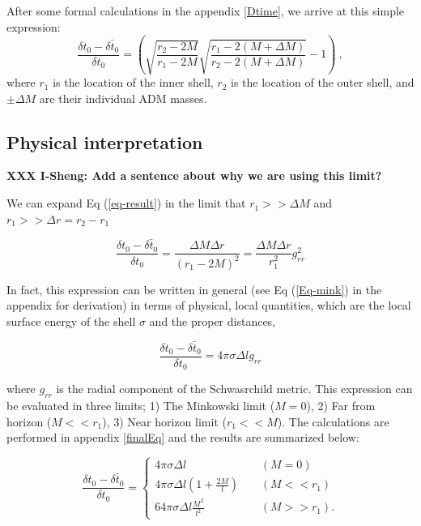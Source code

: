 \documentclass[aps,showpacs,onecolumn,floats,prd,superscriptaddress,nofootinbib]{revtex4-1}
\begin{document}
After some formal calculations in the appendix \ref{Dtime}, we arrive at this simple expression:
\begin{equation}
\frac{\delta t_0 - \bar{\delta t_0}}{\delta t_0} = 
\left(\sqrt{\frac{r_2-2M}{r_1-2M}}\sqrt{\frac{r_1-2(M+\Delta M)}{r_2-2(M+\Delta M)}}-1\right)~,
\label{eq-result}
\end{equation}
where $r_1$ is the location of the inner shell, $r_2$ is the location of the outer shell, and $\pm\Delta M$ are their individual ADM masses. 

\subsection{Physical interpretation}

\textbf{XXX I-Sheng: Add a sentence about why we are using this limit?}
 
We can expand Eq (\ref{eq-result}) in the limit that $r_1>> \Delta M$ and $r_1>> \Delta r = r_2 - r_1$

\begin{equation}
	\frac{\delta t_0 - \bar{ \delta t_0}}{\delta t_0} = \frac{\Delta M \Delta r}{(r_1-2M)^2} = \frac{\Delta M \Delta r}{r_1^2} g_{rr}^{2}	\label{lim-result}
\end{equation}

In fact, this expression can be written in general (see Eq (\ref{Eq-mink}) in the appendix for derivation) in terms of physical, local quantities, which are the local surface energy of the shell $\sigma$ and the proper distances,

\begin{equation}
	\frac{\delta t_0 - \bar{ \delta t_0}}{\delta t_0} = 4 \pi \sigma \Delta l g_{rr}
\end{equation}

where $g_{rr}$ is the radial component of the Schwasrchild metric. This expression can be evaluated in three limits; 1) The Minkowski limit ($M=0$), 2) Far from horizon ($M <<r_1$), 3) Near horizon limit ($r_1<<M$). The calculations are performed in appendix \ref{finalEq} and the results are summarized below:

\begin{equation}
\frac{\delta t_0 - \bar{ \delta t_0}}{\delta t_0} = \begin{cases}
 4 \pi \sigma \Delta l~	 &\ \ \ \ \ (M = 0)\\
4\pi \sigma \Delta l \left( 1 + \frac{2M}{l} \right) & \ \ \ \ \ (M<<r_1)	\\
64 \pi  \sigma \Delta l \frac{M^2}{l^2} & \ \ \ \ \ (M>>r_1).
\end{cases}	\label{fin-result}
\end{equation}
\end{document}
